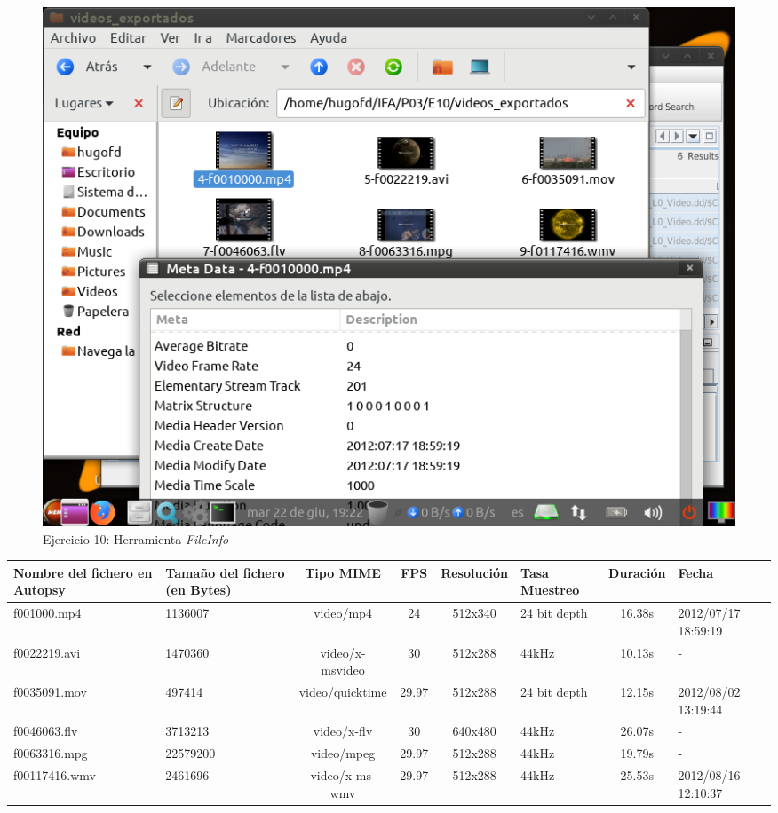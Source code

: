 \documentclass[11pt]{article}
\begin{document}
\begin{figure}[H]
    \caption{Ejercicio 10: Herramienta \textit{FileInfo}}
    \centering
    \includegraphics[scale=0.7]{e10-6.png}
\end{figure}

\begin{table}[H]
    \centering
    \begin{tabular}{|p{2.5cm}|p{2cm}|c|c|c|p{1.5cm}|c|p{2cm}|}
        \hline
        Nombre del fichero en Autopsy & Tamaño del fichero (en Bytes) & Tipo MIME & FPS & Resolución & Tasa Muestreo & Duración & Fecha \\
        \hline\hline
        f001000.mp4 & 1136007 & video/mp4 & 24 & 512x340 & 24 bit depth & 16.38s & 2012/07/17 18:59:19 \\
        \hline
        f0022219.avi & 1470360 & video/x-msvideo & 30 & 512x288 & 44kHz & 10.13s & - \\
        \hline
        f0035091.mov & 497414 & video/quicktime & 29.97 & 512x288 & 24 bit depth & 12.15s & 2012/08/02 13:19:44 \\
        \hline
        f0046063.flv & 3713213 & video/x-flv & 30 & 640x480 & 44kHz & 26.07s & - \\
        \hline
        f0063316.mpg & 22579200 & video/mpeg & 29.97 & 512x288 & 44kHz & 19.79s & - \\
        \hline
        f00117416.wmv & 2461696 & video/x-ms-wmv & 29.97 & 512x288 & 44kHz & 25.53s & 2012/08/16 12:10:37 \\
        \hline
    \end{tabular}
\end{table}
\end{document}
